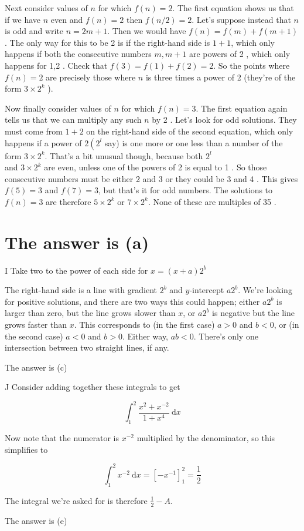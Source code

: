 \documentclass[10pt]{article}
\begin{document}
Next consider values of $n$ for which $f(n)=2$. The first equation shows us that if we have $n$ even and $f(n)=2$ then $f(n / 2)=2$. Let's suppose instead that $n$ is odd and write $n=2 m+1$. Then we would have $f(n)=f(m)+f(m+1)$. The only way for this to be 2 is if the right-hand side is $1+1$, which only happens if both the consecutive numbers $m, m+1$ are powers of 2 , which only happens for 1,2 . Check that $f(3)=f(1)+f(2)=2$. So the points where $f(n)=2$ are precisely those where $n$ is three times a power of 2 (they're of the form $3 \times 2^{k}$ ).

Now finally consider values of $n$ for which $f(n)=3$. The first equation again tells us that we can multiply any such $n$ by 2 . Let's look for odd solutions. They must come from $1+2$ on the right-hand side of the second equation, which only happens if a power of $2\left(2^{l}\right.$ say) is one more or one less than a number of the form $3 \times 2^{k}$. That's a bit unusual though, because both $2^{l}$\\
and $3 \times 2^{k}$ are even, unless one of the powers of 2 is equal to 1 . So those consecutive numbers must be either 2 and 3 or they could be 3 and 4 . This gives $f(5)=3$ and $f(7)=3$, but that's it for odd numbers. The solutions to $f(n)=3$ are therefore $5 \times 2^{k}$ or $7 \times 2^{k}$. None of these are multiples of 35 .

\section*{The answer is (a)}
I Take two to the power of each side for $x=(x+a) 2^{b}$

The right-hand side is a line with gradient $2^{b}$ and $y$-intercept $a 2^{b}$. We're looking for positive solutions, and there are two ways this could happen; either $a 2^{b}$ is larger than zero, but the line grows slower than $x$, or $a 2^{b}$ is negative but the line grows faster than $x$. This corresponds to (in the first case) $a>0$ and $b<0$, or (in the second case) $a<0$ and $b>0$. Either way, $a b<0$. There's only one intersection between two straight lines, if any.

The answer is (c)

J Consider adding together these integrals to get

$$
\int_{1}^{2} \frac{x^{2}+x^{-2}}{1+x^{4}} \mathrm{~d} x
$$

Now note that the numerator is $x^{-2}$ multiplied by the denominator, so this simplifies to

$$
\int_{1}^{2} x^{-2} \mathrm{~d} x=\left[-x^{-1}\right]_{1}^{2}=\frac{1}{2}
$$

The integral we're asked for is therefore $\frac{1}{2}-A$.

The answer is (e)
\end{document}
